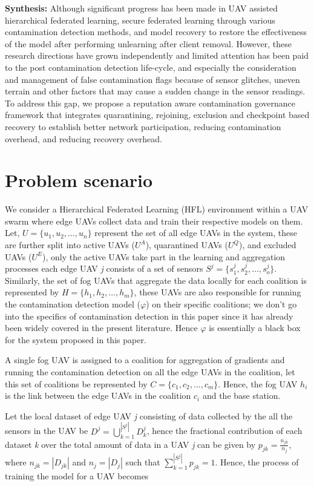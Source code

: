 \documentclass[10pt,journal,compsoc]{IEEEtran}
\begin{document}
\textbf{Synthesis:} Although significant progress has been made in UAV assisted hierarchical federated learning, secure federated learning through various contamination detection methods, and model recovery  to restore the effectiveness of the model after performing unlearning after client removal. However, these research directions have grown independently and limited attention has been paid to the post contamination detection life-cycle, and especially the consideration and management of false contamination flags because of sensor glitches, uneven terrain and other factors that may cause a sudden change in the sensor readings. To address this gap, we propose a reputation aware contamination governance framework that integrates quarantining, rejoining, exclusion and checkpoint based recovery to establish better network participation, reducing contamination overhead, and reducing recovery overhead.

%
%
%
\section{Problem scenario}
We consider a Hierarchical Federated Learning (HFL) environment within a UAV swarm where edge UAVs collect data and train their respective models on them. Let, $U=\{u_1, u_2, \dots, u_n\}$ represent the set of all edge UAVs in the system, these are further split into active UAVs ($U^A$), quarantined UAVs ($U^Q$), and excluded UAVs ($U^E$), only the active UAVs take part in the learning and aggregation processes
each edge UAV \textit{j} consists of a set of sensors $S^j = \{s_1^j, s_2^j, \dots, s_o^j\}$.
Similarly, the set of fog UAVs that aggregate the data locally for each coalition is represented by $H = \{h_1, h_2, \dots, h_m\}$, these UAVs are also responsible for running the contamination detection model ($\varphi$) on their specific coalitions; we don't go into the specifics of contamination detection in this paper since it has already been widely covered in the present literature. Hence $\varphi$ is essentially a black box for the system proposed in this paper.

A single fog UAV is assigned to a coalition for aggregation of gradients and running the contamination detection on all the edge UAVs in the coalition, let this set of coalitions be represented by $C = \{c_1, c_2, \dots, c_m\}$.
Hence, the fog UAV $h_i$ is the link between the edge UAVs in the coalition $c_i$ and the base station.

Let the local dataset of edge UAV \textit{j} consisting of data collected by the all the sensors in the UAV be $D^j = \bigcup_{k =1}^{|S^j|} D^j_{k}$,
hence the fractional contribution of each dataset \textit{k} over the total amount of data in a UAV \textit{j} can be given by $p_{jk} = \frac {n_{jk}} {n_j}$, where $n_{jk} = |D_{jk}|$ and $n_{j} = |D_{j}|$ such that $\sum_{k=1}^{|S^j|} p_{jk} = 1$. Hence, the process of training the model for a UAV becomes
\end{document}
